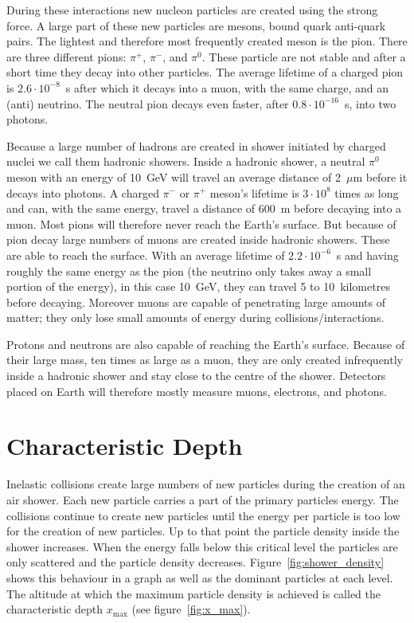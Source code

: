During these interactions new nucleon particles are created using the strong force. A large part of these new particles are mesons, bound quark anti-quark pairs. The lightest and therefore most frequently created meson is the pion. There are three different pions: $\pi^+$, $\pi^-$, and $\pi^0$. These particle are not stable and after a short time they decay into other particles. The average lifetime of a charged pion is $2.6 \cdot 10^{-8}$~s after which it decays into a muon, with the same charge, and an (anti) neutrino. The neutral pion decays even faster, after $0.8 \cdot 10^{-16}$~s, into two photons.

Because a large number of hadrons are created in shower initiated by charged nuclei we call them hadronic showers. Inside a hadronic shower, a neutral $\pi^0$ meson with an energy of 10~GeV will travel an average distance of 2~$\mu$m before it decays into photons. A charged $\pi^-$ or $\pi^+$ meson's lifetime is $3 \cdot 10^8$ times as long and can, with the same energy, travel a distance of 600~m before decaying into a muon. Most pions will therefore never reach the Earth's surface. But because of pion decay large numbers of muons are created inside hadronic showers. These are able to reach the surface. With an average lifetime of $2.2 \cdot 10^{-6}$~s and having roughly the same energy as the pion (the neutrino only takes away a small portion of the energy), in this case 10~GeV, they can travel 5 to 10~kilometres before decaying. Moreover muons are capable of penetrating large amounts of matter; they only lose small amounts of energy during collisions/interactions.

Protons and neutrons are also capable of reaching the Earth's surface. Because of their large mass, ten times as large as a muon, they are only created infrequently inside a hadronic shower and stay close to the centre of the shower. Detectors placed on Earth will therefore mostly measure muons, electrons, and photons.

\section{Characteristic Depth}
Inelastic collisions create large numbers of new particles during the creation of an air shower. Each new particle carries a part of the primary particles energy. The collisions continue to create new particles until the energy per particle is too low for the creation of new particles. Up to that point the particle density inside the shower increases. When the energy falls below this critical level the particles are only scattered and the particle density decreases. Figure~\ref{fig:shower_density} shows this behaviour in a graph as well as the dominant particles at each level. The altitude at which the maximum particle density is achieved is called the characteristic depth $x_{\mbox{max}}$ (see figure~\ref{fig:x_max}).

